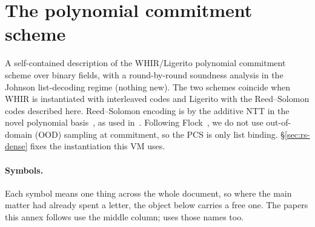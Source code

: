 \section{The polynomial commitment scheme}\label{annex:pcs}

\begin{center}
\end{center}

A self-contained description of the WHIR\slash Ligerito polynomial commitment scheme \cite{ACFY25,NA25} over binary fields, with a round-by-round soundness analysis in the Johnson list-decoding regime (nothing new). The two schemes coincide when WHIR is instantiated with interleaved codes and Ligerito with the Reed--Solomon codes described here. Reed--Solomon encoding is by the additive NTT in the novel polynomial basis~\cite{LCH14}, as used in~\cite{DP26}. Following Flock~\cite{Flock26}, we do not use out-of-domain (OOD) sampling at commitment, so the PCS is only list binding. \S\ref{sec:rs-dense} fixes the instantiation this VM uses.

\paragraph{Symbols.} Each symbol means one thing across the whole document, so where the main matter had already spent a letter, the object below carries a free one. The papers this annex follows use the middle column;  uses those names too.


